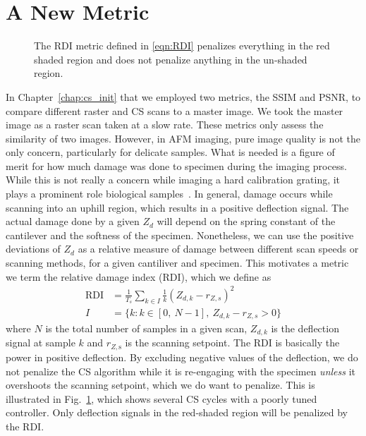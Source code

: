 \section{A New Metric}\label{sec:rdi}
\begin{figure}[t!]
  \centering
  
  \caption{The RDI metric defined in \eqref{eqn:RDI} penalizes everything in the red shaded region and does not penalize anything in the un-shaded region.}
  \label{fig:damage_illustrate}
\end{figure}
In Chapter~\ref{chap:cs_init} that we employed two metrics, the SSIM and PSNR, to compare different raster and CS scans to a master image. We took the master image as a raster scan taken at a slow rate. These metrics only assess the similarity of two images.
However, in AFM imaging, pure image quality is not the only concern, particularly for delicate samples. What is needed is a figure of merit for how much damage was done to specimen during the imaging process. While this is not really a concern while imaging a hard calibration grating, it plays a prominent role biological samples~\cite{ando_highspeed_2008}.
In general, damage occurs while scanning into an uphill region, which results in a positive deflection signal. The actual damage done by a given $Z_d$ will depend on the spring constant of the cantilever and the softness of the specimen.
Nonetheless, we can use the positive deviations of $Z_d$ as a relative measure of damage between different scan speeds or scanning methods, for a given cantiliver and specimen. This motivates a metric we term the relative damage index (RDI), which we define as
\begin{align}
  \text{RDI} &= \frac{1}{T_s}\sum_{k\in I} \frac{1}{k} \left(Z_{d,k} - r_{Z,s}\right)^2 \label{eqn:RDI}\\
  I &= \{k: k\in[0,~N-1],~ Z_{d,k}-r_{Z,s} > 0 \} \nonumber
\end{align}
where $N$ is the total number of samples in a given scan, $Z_{d,k}$ is the deflection signal at sample $k$ and $r_{Z,\textrm{s}}$ is the scanning setpoint. 
The RDI is basically the power in positive deflection.
By excluding negative values of the deflection, we do not penalize the CS algorithm while it is re-engaging with the specimen \emph{unless} it overshoots the scanning setpoint, which we do want to penalize. This is illustrated in Fig.~\ref{fig:damage_illustrate}, which shows several CS cycles with a poorly tuned controller.
Only deflection signals in the red-shaded region will be penalized by the RDI.

